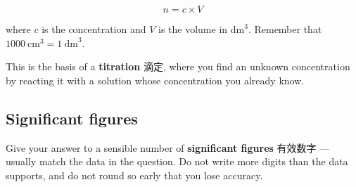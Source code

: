 \documentclass[11pt]{article}
\begin{document}
\[
n = c \times V
\]

where $c$ is the concentration and $V$ is the volume in $\text{dm}^3$. Remember that $1000\ \text{cm}^3 = 1\ \text{dm}^3$.

This is the basis of a \textbf{titration} 滴定, where you find an unknown concentration by reacting it with a solution whose concentration you already know.

\subsection*{Significant figures}

Give your answer to a sensible number of \textbf{significant figures} 有效数字 — usually match the data in the question. Do not write more digits than the data supports, and do not round so early that you lose accuracy.
\end{document}
